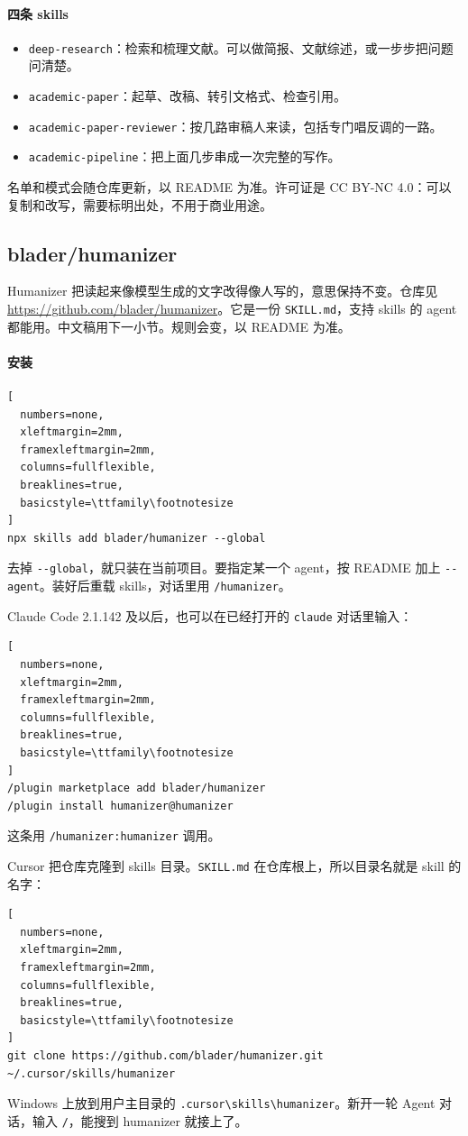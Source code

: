 \paragraph{四条 skills}
\begin{itemize}
\item \verb|deep-research|：检索和梳理文献。可以做简报、文献综述，或一步步把问题问清楚。
\item \verb|academic-paper|：起草、改稿、转引文格式、检查引用。
\item \verb|academic-paper-reviewer|：按几路审稿人来读，包括专门唱反调的一路。
\item \verb|academic-pipeline|：把上面几步串成一次完整的写作。
\end{itemize}
名单和模式会随仓库更新，以 README 为准。许可证是 CC BY-NC 4.0：可以复制和改写，需要标明出处，不用于商业用途。


\subsection{blader/humanizer}
Humanizer 把读起来像模型生成的文字改得像人写的，意思保持不变。仓库见 \url{https://github.com/blader/humanizer}。它是一份 \verb|SKILL.md|，支持 skills 的 agent 都能用。中文稿用下一小节。规则会变，以 README 为准。

\paragraph{安装}
\begin{lstlisting}[
  numbers=none,
  xleftmargin=2mm,
  framexleftmargin=2mm,
  columns=fullflexible,
  breaklines=true,
  basicstyle=\ttfamily\footnotesize
]
npx skills add blader/humanizer --global
\end{lstlisting}
去掉 \verb|--global|，就只装在当前项目。要指定某一个 agent，按 README 加上 \verb|--agent|。装好后重载 skills，对话里用 \verb|/humanizer|。

Claude Code 2.1.142 及以后，也可以在已经打开的 \verb|claude| 对话里输入：
\begin{lstlisting}[
  numbers=none,
  xleftmargin=2mm,
  framexleftmargin=2mm,
  columns=fullflexible,
  breaklines=true,
  basicstyle=\ttfamily\footnotesize
]
/plugin marketplace add blader/humanizer
/plugin install humanizer@humanizer
\end{lstlisting}
这条用 \verb|/humanizer:humanizer| 调用。

Cursor 把仓库克隆到 skills 目录。\verb|SKILL.md| 在仓库根上，所以目录名就是 skill 的名字：
\begin{lstlisting}[
  numbers=none,
  xleftmargin=2mm,
  framexleftmargin=2mm,
  columns=fullflexible,
  breaklines=true,
  basicstyle=\ttfamily\footnotesize
]
git clone https://github.com/blader/humanizer.git ~/.cursor/skills/humanizer
\end{lstlisting}
Windows 上放到用户主目录的 \verb|.cursor\skills\humanizer|。新开一轮 Agent 对话，输入 \verb|/|，能搜到 humanizer 就接上了。

